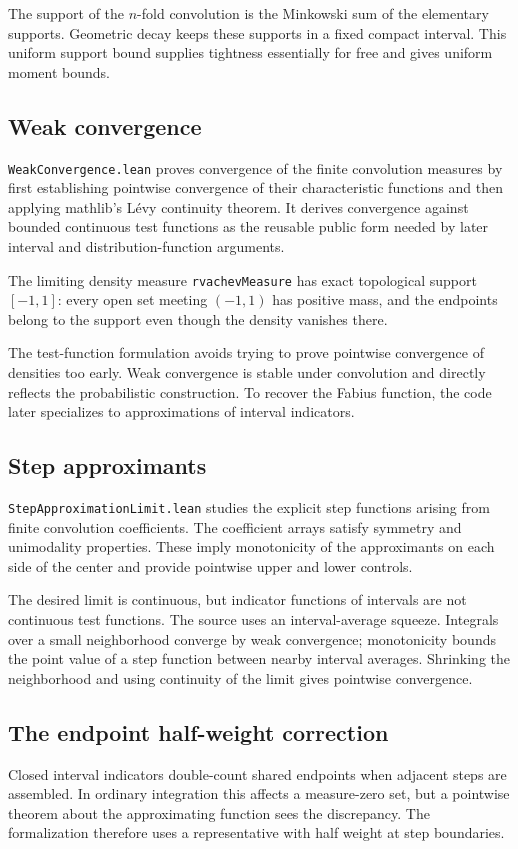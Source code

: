 \documentclass[11pt,oneside]{article}
\theoremstyle{definition}
\theoremstyle{remark}
\begin{document}
The support of the \(n\)-fold convolution is the Minkowski sum of the elementary supports.  Geometric decay keeps these supports in a fixed compact interval.  This uniform support bound supplies tightness essentially for free and gives uniform moment bounds.

\subsection{Weak convergence}
\nolinkurl{WeakConvergence.lean} proves convergence of the finite convolution
measures by first establishing pointwise convergence of their characteristic
functions and then applying mathlib's Lévy continuity theorem.  It derives
convergence against bounded continuous test functions as the reusable public
form needed by later interval and distribution-function arguments.

The limiting density measure \nolinkurl{rvachevMeasure} has exact topological
support \([-1,1]\): every open set meeting \((-1,1)\) has positive mass, and
the endpoints belong to the support even though the density vanishes there.

The test-function formulation avoids trying to prove pointwise convergence of densities too early.  Weak convergence is stable under convolution and directly reflects the probabilistic construction.  To recover the Fabius function, the code later specializes to approximations of interval indicators.

\subsection{Step approximants}
\nolinkurl{StepApproximationLimit.lean} studies the explicit step functions arising from finite convolution coefficients.  The coefficient arrays satisfy symmetry and unimodality properties.  These imply monotonicity of the approximants on each side of the center and provide pointwise upper and lower controls.

The desired limit is continuous, but indicator functions of intervals are not continuous test functions.  The source uses an interval-average squeeze.  Integrals over a small neighborhood converge by weak convergence; monotonicity bounds the point value of a step function between nearby interval averages.  Shrinking the neighborhood and using continuity of the limit gives pointwise convergence.

\subsection{The endpoint half-weight correction}
Closed interval indicators double-count shared endpoints when adjacent steps are assembled.  In ordinary integration this affects a measure-zero set, but a pointwise theorem about the approximating function sees the discrepancy.  The formalization therefore uses a representative with half weight at step boundaries.
\end{document}
